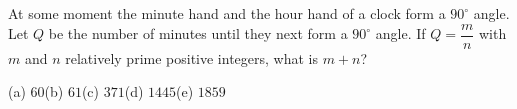 At some moment the minute hand and the hour hand of a clock form a $90^\circ$ angle. Let $Q$ be the number of minutes until they next form a $90^\circ$ angle. If $Q=\dfrac {m}{n}$ with $m$ and $n$ relatively prime positive integers, what is $m+n$?

(a) $60$\quad (b) $61$\quad (c) $371$\quad (d) $1445$\quad (e) $1859$
